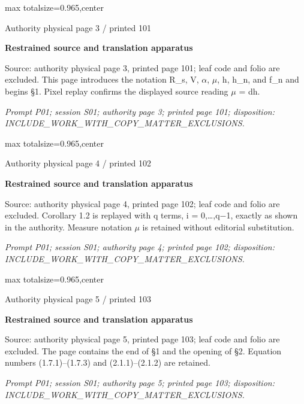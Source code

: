 \documentclass{article}
\begin{document}
\newpage
\noindent\begin{adjustbox}{max totalsize={\textwidth}{0.965\textheight},center}\begin{minipage}{\textwidth}
\noindent\hfill\scriptsize Authority physical page 3 / printed 101\par\normalsize
\textbf{Restrained source and translation apparatus}\par
Source: authority physical page 3, printed page 101; leaf code and folio are excluded. This page introduces the notation R\_s, V, \ensuremath{\alpha}, \ensuremath{\mu}, h, h\_n, and f\_n and begins §1. Pixel replay confirms the displayed source reading \ensuremath{\mu} = dh.
\par\smallskip
\textit{Prompt P01; session S01; authority page 3; printed page 101; disposition: INCLUDE\_WORK\_WITH\_COPY\_MATTER\_EXCLUSIONS.}
\end{minipage}\end{adjustbox}

\newpage
\noindent\begin{adjustbox}{max totalsize={\textwidth}{0.965\textheight},center}\begin{minipage}{\textwidth}
\noindent\hfill\scriptsize Authority physical page 4 / printed 102\par\normalsize
\textbf{Restrained source and translation apparatus}\par
Source: authority physical page 4, printed page 102; leaf code and folio are excluded. Corollary 1.2 is replayed with q terms, i = 0,…,q\ensuremath{-}1, exactly as shown in the authority. Measure notation \ensuremath{\mu} is retained without editorial substitution.
\par\smallskip
\textit{Prompt P01; session S01; authority page 4; printed page 102; disposition: INCLUDE\_WORK\_WITH\_COPY\_MATTER\_EXCLUSIONS.}
\end{minipage}\end{adjustbox}

\newpage
\noindent\begin{adjustbox}{max totalsize={\textwidth}{0.965\textheight},center}\begin{minipage}{\textwidth}
\noindent\hfill\scriptsize Authority physical page 5 / printed 103\par\normalsize
\textbf{Restrained source and translation apparatus}\par
Source: authority physical page 5, printed page 103; leaf code and folio are excluded. The page contains the end of §1 and the opening of §2. Equation numbers (1.7.1)–(1.7.3) and (2.1.1)–(2.1.2) are retained.
\par\smallskip
\textit{Prompt P01; session S01; authority page 5; printed page 103; disposition: INCLUDE\_WORK\_WITH\_COPY\_MATTER\_EXCLUSIONS.}
\end{minipage}\end{adjustbox}
\end{document}

